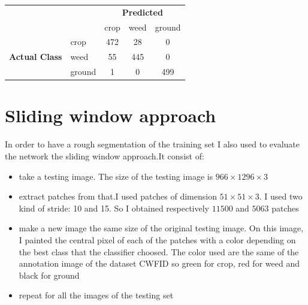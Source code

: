 \documentclass[]{report}
\begin{document}
\begin{table}[h]
\centering

\begin{tabular}{cl|c|c|c|}
\cline{3-5}
\multicolumn{1}{l}{}                                         &        & \multicolumn{3}{c|}{\textbf{Predicted}}                                             \\ \cline{3-5} 
\textbf{}                                                    &        & \multicolumn{1}{l|}{crop} & \multicolumn{1}{l|}{weed} & \multicolumn{1}{l|}{ground} \\ \hline
\multicolumn{1}{|c|}{\multirow{3}{*}{\textbf{Actual Class}}} & crop   & 472                       & 28                        & 0                           \\ \cline{2-5} 
\multicolumn{1}{|c|}{}                                       & weed   & 55                        & 445                       & 0                           \\ \cline{2-5} 
\multicolumn{1}{|c|}{}                                       & ground & 1                         & 0                         & 499                         \\ \hline
\end{tabular}
\end{table} 


\section{Sliding window approach}

In order to have a rough segmentation of the training set I also used to evaluate the network the sliding window approach.It consist of:

\begin{itemize}

	\item take a testing image. The size of the testing image is $ 966\times 1296\times 3$
	\item extract patches from that.I used patches of dimension $ 51\times 51 \times 3 $. 				  I used two kind of stride: 10 and 15. So I obtained respectively $ 11500 $ and $ 		 		  5063 $ patches
	\item make a new image the same size of the original testing image. On this image, I 					  painted the central pixel of each of the patches with a color depending on the best  		  class that the classifier choosed. The color used are the same of the annotation 		          image of the dataset CWFID so green for crop, red for weed and black for ground
	\item repeat for all the images of the testing set

\end{itemize}
\end{document}
